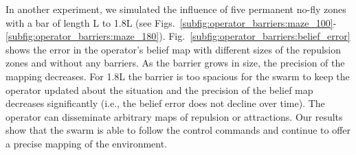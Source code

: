 \documentclass[runningheads]{llncs}%
\begin{document}
In another experiment, we simulated the influence of five permanent no-fly zones with a bar of length L to 1.8L (see Figs.~\ref{subfig:operator_barriers:maze_100}-\ref{subfig:operator_barriers:maze_180}). Fig.~\ref{subfig:operator_barriers:belief_error} shows the error in the operator's belief map with different sizes of the repulsion zones and without any barriers. As the barrier grows in size, the precision of the mapping decreases. For 1.8L the barrier is too spacious for the swarm to keep the operator updated about the situation and the precision of the belief map decreases significantly (i.e., the belief error does not decline over time). The operator can disseminate arbitrary maps of repulsion or attractions. Our results show that the swarm is able to follow the control commands and continue to offer a precise mapping of the environment.
\end{document}
